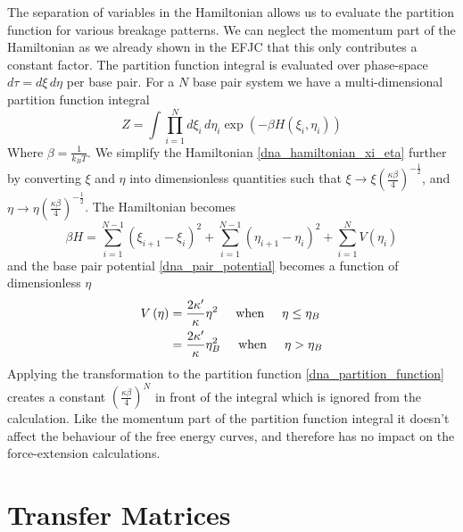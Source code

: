 The separation of variables in the Hamiltonian allows us to evaluate the partition function for various breakage patterns. We can neglect the momentum part of the Hamiltonian as we already shown in the EFJC that this only contributes a constant factor. The partition function integral is evaluated over phase-space $d\tau=d\xi\,d\eta$ per base pair. For a $N$ base pair system we have a multi-dimensional partition function integral
%
\begin{equation}
\label{dna_partition_function}
Z=\int \prod^{N}_{i=1}d\xi_{i}\,d\eta_{i}\exp\left(-\beta H\left(\xi_{i},\eta_{i}\right)\right)
\end{equation}
%
Where $\beta=\frac{1}{k_{B}T}$. We simplify the Hamiltonian \eqref{dna_hamiltonian_xi_eta} further by converting $\xi$ and $\eta$ into dimensionless quantities such that $\xi \to \xi\left(\frac{\kappa\beta}{4}\right)^{-\frac{1}{2}}$, and $\eta \to \eta\left(\frac{\kappa\beta}{4}\right)^{-\frac{1}{2}}$.  The Hamiltonian becomes
%
\begin{equation}
\label{dna_betaH}
\beta H = \sum_{i=1}^{N-1} \left(\xi_{i+1}-\xi_{i} \right)^2 + \sum_{i=1}^{N-1} \left(\eta_{i+1}-\eta_{i} \right)^2 + \sum_{i=1}^{N} V\left(\eta_{i}\right)
\end{equation}
%
and the base pair potential \eqref{dna_pair_potential} becomes a function of dimensionless $\eta$
%
\begin{align}
\label{dimensionless_dna_pair_potential}
V\left(\eta\right)&=\frac{2 \kappa'}{\kappa}\eta^{2} \text{\hspace{5 mm}when\hspace{5 mm}}\eta \leq \eta_{B} \\
&=\frac{2 \kappa'}{\kappa}\eta_{B}^{2} \text{\hspace{5 mm}when\hspace{5 mm}}\eta > \eta_{B}\nonumber
\end{align}
%
Applying the transformation to the partition function \eqref{dna_partition_function} creates a constant $\left(\frac{\kappa\beta}{4}\right)^{N}$ in front of the integral which is ignored from the calculation. Like the momentum part of the partition function integral it doesn't affect the behaviour of the free energy curves, and therefore has no impact on the force-extension calculations. 

\section{Transfer Matrices}

